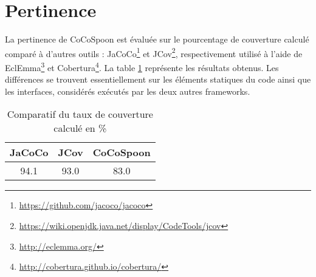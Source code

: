 \section{Pertinence}

La pertinence de CoCoSpoon est évaluée sur le pourcentage de couverture calculé comparé à d'autres outils : JaCoCo\footnote{\url{https://github.com/jacoco/jacoco}} et JCov\footnote{\url{https://wiki.openjdk.java.net/display/CodeTools/jcov}}, respectivement utilisé à l'aide de EclEmma\footnote{\url{http://eclemma.org/}} et Cobertura\footnote{\url{http://cobertura.github.io/cobertura/}}. La table \ref{evaluation_pertinence} représente les résultats obtenus. Les différences se trouvent essentiellement sur les éléments statiques du code ainsi que les interfaces, considérés exécutés par les deux autres frameworks. 

\begin{table}[H]
\centering
\begin{tabular}{|c|c|c|}
  \hline
  JaCoCo & JCov & CoCoSpoon \\
  \hline
  94.1 & 93.0 & 83.0 \\
  \hline
\end{tabular}

\label{evaluation_pertinence}
\caption{Comparatif du taux de couverture calculé en \%}
\end{table}


